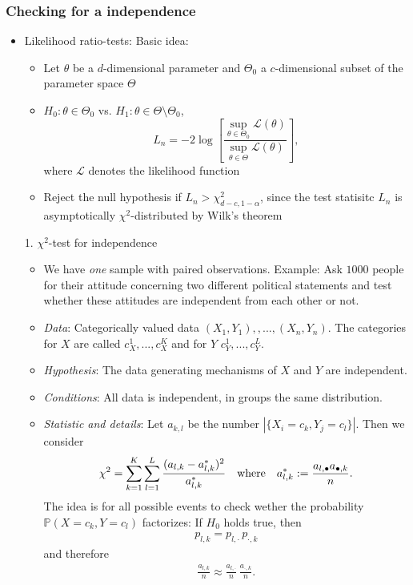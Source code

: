 \documentclass[12pt,a4paper]{amsart}
\theoremstyle{definition}
\theoremstyle{remark}
\numberwithin{equation}{section}
\begin{document}
\subsubsection{Checking for a independence}

\begin{itemize}
\item Likelihood ratio-tests: Basic idea:
\begin{itemize}
\item Let $\theta$ be a $d$-dimensional parameter and $\Theta_0$ a $c$-dimensional subset of the parameter space $\Theta$
\item $H_0: \theta\in \Theta_0$ vs. $H_1:\theta\in \Theta\setminus \Theta_0$,
$$L_n=-2\log\left[\frac{\sup_{\theta\in\Theta_0} \mathcal{L}(\theta)}{\sup_{\theta\in\Theta} \mathcal{L}(\theta)}\right],$$
where $\mathcal{L}$ denotes the likelihood function
\item Reject the null hypothesis if $L_n>\chi^2_{d-c,1-\alpha}$, since the test statisitc $L_n$ is asymptotically $\chi^2$-distributed by Wilk's theorem 

\end{itemize}
\item[1.] $\chi^2$-test for independence
\begin{itemize}
\item We have \textit{one} sample with paired observations. Example: Ask $1000$ people for their attitude concerning two different political statements and test whether these attitudes are independent from each other or not.
\item \textit{Data}: Categorically valued data $(X_1,Y_1),,...,(X_n,Y_n)$. The categories for $X$ are called $c_X^1,...,c_X^K$ and for $Y$ $c_Y^1,...,c_Y^L$. 
\item \textit{Hypothesis}: The data generating mechanisms of $X$ and $Y$ are independent.
\item \textit{Conditions}: All data is independent, in groups the same distribution.
\item \textit{Statistic and details}: Let $a_{k,l}$ be the number  $|\{X_i=c_k, Y_j=c_l\}|$. Then we consider 
$$\chi^2=\sum_{k=1}^K \sum_{l=1} ^L \frac{(a_{l,k}-a_{l,k}^*)^2}{a_{l,k}^*} \quad \textnormal{where} \quad a_{l,k}^*:=\frac{a_{l, \bullet}a_{\bullet,k}}{n}.$$
The idea is for all possible events to check wether the probability $\mathbb{P}(X=c_k, Y=c_l)$ factorizes: If $H_0$ holds true, then
\begin{align*}
p_{l,k}=p_{l,\cdot}\, p_{\cdot,k}
\end{align*}
and therefore 
\begin{align*}
\frac{a_{l,k}}{n}\approx \frac{a_{l,\cdot}}{n} \, \frac{a_{\cdot,k}}{n}.
\end{align*}


\end{itemize}
\end{itemize}
\end{document}
